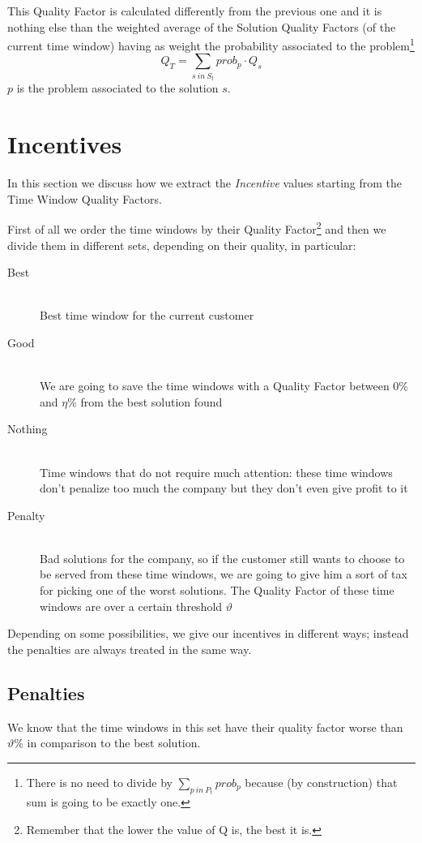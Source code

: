 \documentclass[10pt, letterpaper]{article}
\begin{document}
This Quality Factor is calculated differently from the previous one and it is
nothing else than the weighted average of the Solution Quality Factors (of the
current time window) having as weight the probability associated to the
problem\footnote{There is no need to divide by \(\sum_{p\ in\ P_{t}} prob_{p}\)
because (by construction) that sum is going to be exactly one.}
\[Q_{T} = \sum_{s\ in\ S_{t}} prob_{p} \cdot Q_{s} \]
$p$ is the problem associated to the solution $s$.

\section{Incentives}
In this section we discuss how we extract the \emph{Incentive} values starting
from the Time Window Quality Factors.

First of all we order the time windows by their Quality Factor\footnote{Remember
that the lower the value of Q is, the best it is.} and then we divide them in
different sets, depending on their quality, in particular:
\begin{description}
	\item[Best] \hfill \\
		Best time window for the current customer
	\item[Good] \hfill \\ 
		We are going to save the time windows with a Quality Factor between 0\%
		and $\eta\%$ from the best solution found
	\item[Nothing] \hfill \\ 
		Time windows that do not require much attention: these time windows
		don't penalize too much the company but they don't even give profit to
		it
	\item[Penalty] \hfill \\ 
		Bad solutions for the company, so if the customer still wants to choose
		to be served from these time windows, we are going to give him a sort of
		tax for picking one of the worst solutions. The Quality Factor of these
		time windows are over a certain threshold $\vartheta$
\end{description}

Depending on some possibilities, we give our incentives in different ways;
instead the penalties are always treated in the same way.

\subsection{Penalties}
We know that the time windows in this set have their quality factor worse than
$\vartheta\%$ in comparison to the best solution.
\end{document}
